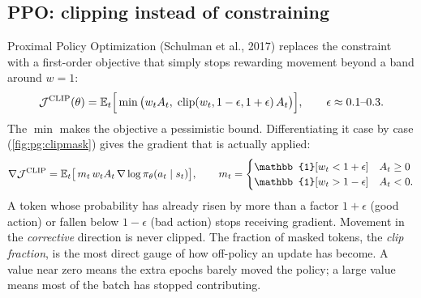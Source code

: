 \subsection{PPO: clipping instead of constraining}\label{sec:pg:ppo}

Proximal Policy Optimization (Schulman et al., 2017) replaces the constraint with a
first-order objective that simply stops rewarding movement beyond a band around
$w=1$:
\begin{equation}
\mathcal{J}^{\text{CLIP}}(\theta)=\mathbb{E}_t\Big[\min\big(w_t A_t,\;\operatorname{clip}(w_t,1-\epsilon,1+\epsilon)\,A_t\big)\Big],
\qquad \epsilon\approx0.1\text{--}0.3 .
\label{eq:pg:ppo}
\end{equation}
The $\min$ makes the objective a pessimistic bound. Differentiating it case by case
(\cref{fig:pg:clipmask}) gives the gradient that is actually applied:
\begin{equation}
\nabla\mathcal{J}^{\text{CLIP}}=\E_t\big[\,m_t\,w_t A_t\,\nabla\log\pitheta(a_t\mid s_t)\big],\qquad
m_t=\begin{cases}\mathbb{1}[w_t<1+\epsilon] & A_t\ge0\\ \mathbb{1}[w_t>1-\epsilon] & A_t<0.\end{cases}
\end{equation}
A token whose probability has already risen by more than a factor $1+\epsilon$ (good action)
or fallen below $1-\epsilon$ (bad action) stops receiving gradient. Movement in the
\emph{corrective} direction is never clipped. The fraction of masked tokens, the \emph{clip
fraction}, is the most direct gauge of how off-policy an update has become. A value near zero
means the extra epochs barely moved the policy; a large value means most of the batch has
stopped contributing.

